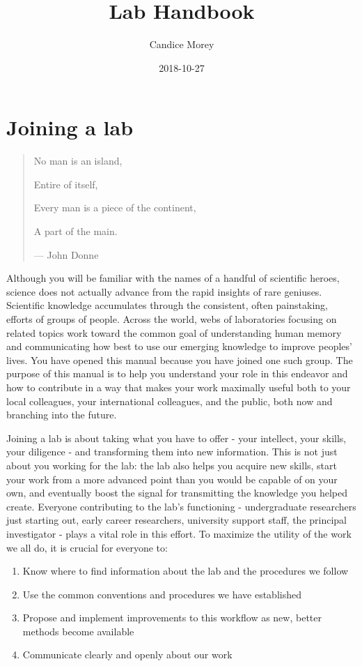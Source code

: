 \documentclass[12pt,]{book}
\title{Lab Handbook}
\author{Candice Morey}
\date{2018-10-27}
\theoremstyle{definition}
\theoremstyle{definition}
\theoremstyle{definition}
\theoremstyle{remark}
\begin{document}
\maketitle

{
\setcounter{tocdepth}{1}
\tableofcontents
}
\chapter{Joining a lab}\label{joining-a-lab}

\begin{quote}
No man is an island,

Entire of itself,

Every man is a piece of the continent,

A part of the main.

--- John Donne
\end{quote}

Although you will be familiar with the names of a handful of scientific
heroes, science does not actually advance from the rapid insights of
rare geniuses. Scientific knowledge accumulates through the consistent,
often painstaking, efforts of groups of people. Across the world, webs
of laboratories focusing on related topics work toward the common goal
of understanding human memory and communicating how best to use our
emerging knowledge to improve peoples' lives. You have opened this
manual because you have joined one such group. The purpose of this
manual is to help you understand your role in this endeavor and how to
contribute in a way that makes your work maximally useful both to your
local colleagues, your international colleagues, and the public, both
now and branching into the future.

Joining a lab is about taking what you have to offer - your intellect,
your skills, your diligence - and transforming them into new
information. This is not just about you working for the lab: the lab
also helps you acquire new skills, start your work from a more advanced
point than you would be capable of on your own, and eventually boost the
signal for transmitting the knowledge you helped create. Everyone
contributing to the lab's functioning - undergraduate researchers just
starting out, early career researchers, university support staff, the
principal investigator - plays a vital role in this effort. To maximize
the utility of the work we all do, it is crucial for everyone to:

\begin{enumerate}
\def\labelenumi{\arabic{enumi}.}
\item
  Know where to find information about the lab and the procedures we
  follow
\item
  Use the common conventions and procedures we have established
\item
  Propose and implement improvements to this workflow as new, better
  methods become available
\item
  Communicate clearly and openly about our work
\end{enumerate}
\end{document}
